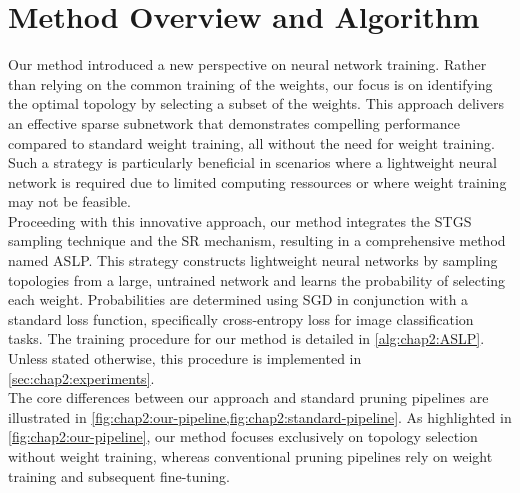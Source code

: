 \section{Method Overview and Algorithm}\label{sec:chap2:overview}
Our method introduced a new perspective on neural network training. Rather than
relying on the common training of the weights, our focus is on identifying the
optimal topology by selecting a subset of the weights. This approach delivers an
effective sparse subnetwork that demonstrates compelling performance compared to
standard weight training, all without the need for weight training. Such a
strategy is particularly beneficial in scenarios where a lightweight neural
network is required due to limited computing ressources or where weight training
may not be feasible.\\

Proceeding with this innovative approach, our method integrates the \acl{STGS}
sampling technique and the \acl{SR} mechanism, resulting in a comprehensive
method named \acf{ASLP}. This strategy constructs lightweight neural networks by
sampling topologies from a large, untrained network and learns the probability
of selecting each weight. Probabilities are determined using \acl{SGD} in
conjunction with a standard loss function, specifically cross-entropy loss for
image classification tasks. The training procedure for our method is detailed in
\cref{alg:chap2:ASLP}. Unless stated otherwise, this procedure is implemented in
\cref{sec:chap2:experiments}.\\

The core differences between our approach and standard pruning pipelines are
illustrated in \cref{fig:chap2:our-pipeline,fig:chap2:standard-pipeline}. As
highlighted in \cref{fig:chap2:our-pipeline}, our method focuses exclusively on
topology selection without weight training, whereas conventional pruning
pipelines rely on weight training and subsequent fine-tuning.\\


